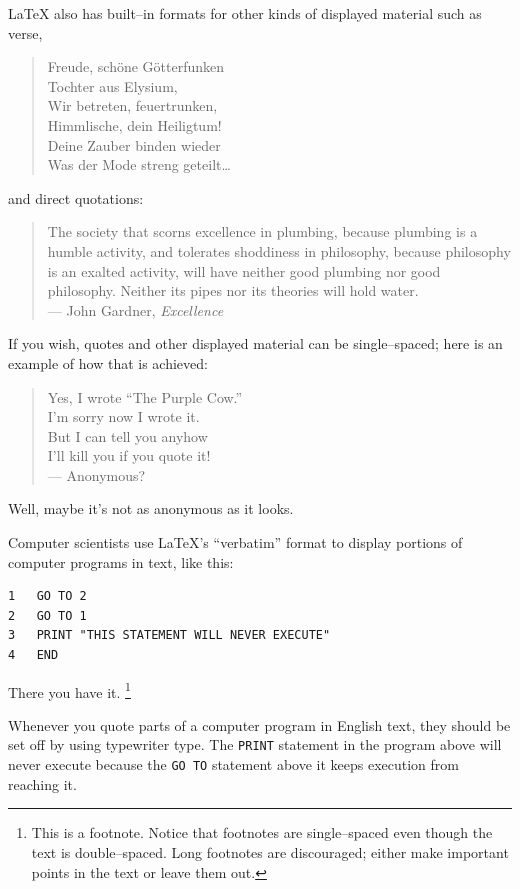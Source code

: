 \documentclass[12pt]{report}
\begin{document}
LaTeX also has built--in formats for other kinds of displayed material
such as verse,
\begin{verse}
Freude, sch\"{o}ne G\"{o}tterfunken  \\
Tochter aus Elysium,                 \\
Wir betreten, feuertrunken,          \\
Himmlische, dein Heiligtum!          \\
Deine Zauber binden wieder            \\
Was der Mode streng geteilt\dots
\end{verse}
and direct quotations:
\begin{quote}
The society that scorns excellence in plumbing, because plumbing is a
humble activity, and tolerates shoddiness in philosophy, because
philosophy is an exalted activity, will have neither good plumbing nor
good philosophy.  Neither its pipes nor its theories will hold water.\\
\hspace*{\fill} --- John Gardner, {\em Excellence}
\end{quote}
If you wish, quotes and other displayed material can be single--spaced;
here is an example of how that is achieved:
\begin{verse}
\begin{singlespace}
Yes, I wrote ``The Purple Cow.'' \\
I'm sorry now I wrote it. \\
But I can tell you anyhow \\
I'll kill you if you quote it! \\
\hfill --- Anonymous?
\end{singlespace}
\end{verse}
Well, maybe it's not as anonymous as it looks.

Computer scientists use LaTeX's ``verbatim'' format to display portions
of computer programs in text, like this:
\begin{verbatim}
1   GO TO 2
2   GO TO 1
3   PRINT "THIS STATEMENT WILL NEVER EXECUTE"
4   END
\end{verbatim}
There you have it.%
\footnote{This is a footnote. Notice that footnotes are single--spaced
even though the text is double--spaced. Long footnotes are discouraged;
either make important points in the text or leave them out.}

Whenever you quote parts of a computer program in English text, they
should be set off by using typewriter type.  The \verb"PRINT" statement
in the program above will never execute because the \verb"GO TO"
statement above it keeps execution from reaching it.
\end{document}
